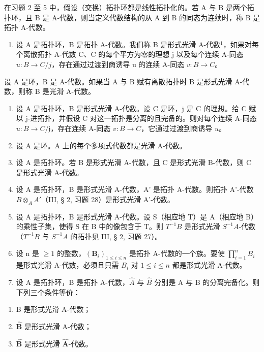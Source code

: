 在习题 2 至 5 中，假设（交换）拓扑环都是线性拓扑化的。若 A 与 B 是两个拓扑环，且 B 是 A-代数，则当定义代数结构的从 A 到 B 的同态为连续时，称 B 是拓扑 A-代数。

\begin{enumerate}
\def\labelenumi{\arabic{enumi})}
\setcounter{enumi}{1}
\tightlist
\item
  设 A 是拓扑环，B 是拓扑 A-代数。我们称 B 是形式光滑 A-代数\(^{1}\)，如果对每个离散拓扑 A-代数 C、C 的每个平方为零的理想 j 以及每个连续 A-同态 \(u: B \to C/j\)，存在通过过渡到商诱导 u 的连续 A-同态 \(v: B \to C\)。
\end{enumerate}

设 A 是环，B 是 A-代数。如果当 A 与 B 赋有离散拓扑时 B 是形式光滑 A-代数，则称 B 是光滑 A-代数。

\begin{enumerate}
\def\labelenumi{\alph{enumi})}
\item
  设 A 是拓扑环，B 是形式光滑 A-代数。设 C 是环，j 是 C 的理想。给 C 赋以 j-进拓扑，并假设 C 对这一拓扑是分离的且完备的。则对每个连续 A-同态 \(u:B\to C/\mathfrak{j}\)，存在连续 A-同态 \(v:B\to C\)，它通过过渡到商诱导 \(u\)。
\item
  设 A 是环。A 上的每个多项式代数都是光滑 A-代数。
\item
  设 A 是拓扑环。若 B 是形式光滑 A-代数，且 C 是形式光滑 B-代数，则 C 是形式光滑 A-代数。
\item
  设 A 是拓扑环，B 是形式光滑 A-代数，A' 是拓扑 A-代数。则拓扑 A'-代数 \(B \otimes_{A} A'\)（III, § 2, 习题 28）是形式光滑 A'-代数。
\item
  设 A 是拓扑环，B 是形式光滑 A-代数。设 S（相应地 T）是 A（相应地 B）的乘性子集，使得 S 在 B 中的像包含于 T。则 \(T^{-1}B\) 是形式光滑 \(S^{-1}A\)-代数（\(T^{-1}B\) 与 \(S^{-1}A\) 的拓扑见 III, § 2, 习题 27）。
\item
  设 n 是 \(\geqslant 1\) 的整数，\((\mathbf{B}_{i})_{1\leqslant i\leqslant n}\) 是拓扑 A-代数的一个族。要使 \(\prod_{i=1}^{n} B_{i}\) 是形式光滑 A-代数，必须且只需 \(B_{i}\) 对 \(1 \leqslant i \leqslant n\) 都是形式光滑 A-代数。
\item
  设 A 是拓扑环，B 是拓扑 A-代数，\(\hat{A}\) 与 \(\hat{B}\) 分别是 A 与 B 的分离完备化。则下列三个条件等价：
\end{enumerate}

\begin{enumerate}
\def\labelenumi{(\roman{enumi})}
\item
  B 是形式光滑 A-代数；
\item
  \(\hat{\mathbf{B}}\) 是形式光滑 A-代数；
\item
  \(\hat{\mathbf{B}}\) 是形式光滑 \(\hat{\mathbf{A}}\)-代数。
\end{enumerate}

